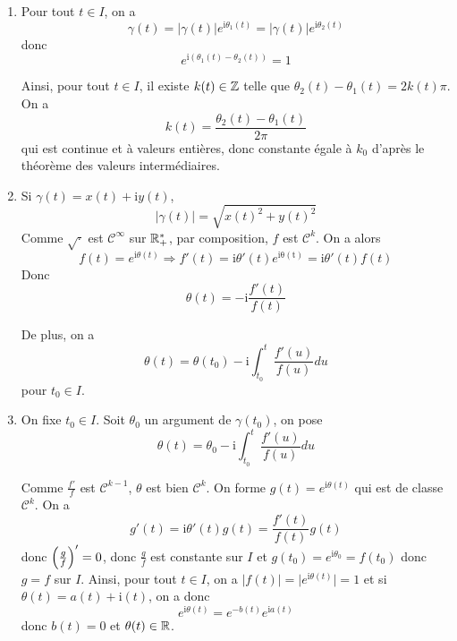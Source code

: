 \begin{solution}
	\phantom{}
	\begin{enumerate}
		\item Pour tout $t\in I$, on a 
		$$\gamma(t)=\vert\gamma(t)\vert e^{\mathrm{i}\theta_{1}(t)}=\vert\gamma(t)\vert e^{\mathrm{i}\theta_{2}(t)}$$
		donc 
		$$e^{\mathrm{i}(\theta_{1}(t)-\theta_{2}(t))}=1$$

		Ainsi, pour tout $t\in I$, il existe $k(t)\in\mathbb{Z}$ telle que $\theta_{2}(t)-\theta_{1}(t)=2k(t)\pi$. On a 
		$$k(t)=\frac{\theta_{2}(t)-\theta_{1}(t)}{2\pi}$$
		qui est continue et à valeurs entières, donc constante égale à $k_{0}$ d'après le théorème des valeurs intermédiaires.

		\item Si $\gamma(t)=x(t)+\mathrm{i}y(t)$, 
		$$\vert\gamma(t)\vert=\sqrt{x(t)^{2}+y(t)^{2}}$$
		Comme $\sqrt{\cdot}$ est $\mathcal{C}^{\infty}$ sur $\mathbb{R}_{+}^{*}$, par composition, $f$ est $\mathcal{C}^{k}$. On a alors
		$$f(t)=e^{\mathrm{i}\theta(t)}\Rightarrow f'(t)=\mathrm{i}\theta'(t)e^{\mathrm{i\theta(t)}}=\mathrm{i}\theta'(t)f(t)$$
		Donc 
		$$\theta(t)=-\mathrm{i}\frac{f'(t)}{f(t)}$$

		De plus, on a 
		$$\theta(t)=\theta(t_{0})-\mathrm{i}\int_{t_{0}}^{t}\frac{f'(u)}{f(u)}du$$
		pour $t_{0}\in I$.

		\item On fixe $t_{0}\in I$. Soit $\theta_{0}$ un argument de $\gamma(t_{0})$, on pose 
		$$\theta(t)=\theta_{0}-\mathrm{i}\int_{t_{0}}^{t}\frac{f'(u)}{f(u)}du$$
		
		Comme $\frac{f'}{f}$ est $\mathcal{C}^{k-1}$, $\theta$ est bien $\mathcal{C}^{k}$. On forme $g(t)=e^{\mathrm{i}\theta(t)}$ qui est de classe $\mathcal{C}^{k}$. On a 
		$$g'(t)=\mathrm{i}\theta'(t)g(t)=\frac{f'(t)}{f(t)}g(t)$$
		donc $\Bigl(\frac{g}{f}\Bigr)'=0$, donc $\frac{g}{f}$ est constante sur $I$ et $g(t_{0})=e^{\mathrm{i}\theta_{0}}=f(t_{0})$ donc $g=f$ sur $I$. Ainsi, pour tout $t\in I$, on a $\vert f(t)\vert=\vert e^{\mathrm{i}\theta(t)}\vert=1$ et si $\theta(t)=a(t)+\mathrm{i}(t)$, on a donc 
		$$e^{\mathrm{i}\theta(t)}=e^{-b(t)}e^{\mathrm{i}a(t)}$$
		donc $b(t)=0$ et $\theta(t)\in\mathbb{R}$.
	\end{enumerate}
\end{solution}